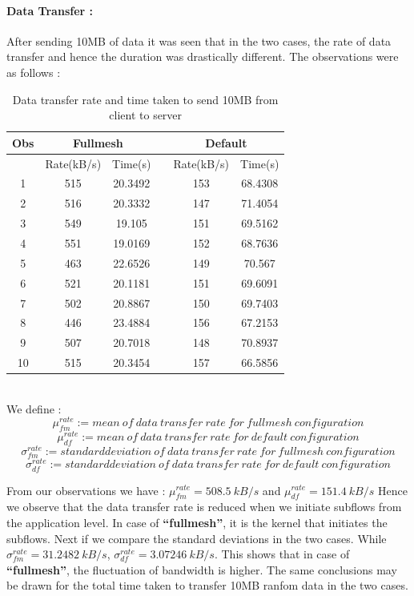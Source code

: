 \documentclass[a4paper,11pt]{article}
\begin{document}
			\paragraph{Data Transfer : }
			\label{subsubsubsec:datatransfer}
			After sending 10MB of data it was seen that in the two cases, the rate of data transfer and hence the duration was drastically different. The observations were as follows :
			\begin{table}[h!]
				
				
				\centering
				\begin{tabular}{|c|c|c|c|c|c|}
					\hline
					Obs & \multicolumn{2}{|c|}{Fullmesh} &  & \multicolumn{2}{|c|}{Default} \\
					\hline
					\hline
					& Rate(kB/s) & Time(s) &  & Rate(kB/s) & Time(s) \\
					\hline
					\hline
					1 & 515 & 20.3492 &  & 153 & 68.4308 \\
					\hline
					2 & 516 & 20.3332 &  & 147 & 71.4054 \\
					\hline
					3 & 549 & 19.105 &  & 151 & 69.5162 \\
					\hline
					4 & 551 & 19.0169 &  & 152 & 68.7636 \\
					\hline
					5 & 463 & 22.6526 &  & 149 & 70.567 \\
					\hline
					6 & 521 & 20.1181 &  & 151 & 69.6091 \\
					\hline
					7 & 502 & 20.8867 &  & 150 & 69.7403 \\
					\hline
					8 & 446 & 23.4884 &  & 156 & 67.2153 \\
					\hline
					9 & 507 & 20.7018 &  & 148 & 70.8937 \\
					\hline
					10 & 515 & 20.3454 &  & 157 & 66.5856 \\
					\hline
				\end{tabular}
				\caption{Data transfer rate and time taken to send 10MB from client to server}
			\end{table} \\
			We define :
			$$\mu_{fm}^{rate} := mean\ of\ data\ transfer\ rate\ for\ fullmesh\ configuration$$ 
			$$\mu_{df}^{rate} := mean\ of\ data\ transfer\ rate\ for\ default\ configuration$$
			$$\sigma_{fm}^{rate} := standard deviation\ of\ data\ transfer\ rate\ for\ fullmesh\ configuration$$
			$$\sigma_{df}^{rate} := standard deviation\ of\ data\ transfer\ rate\ for\ default\ configuration$$

			From our observations we have :
			$\mu_{fm}^{rate} = 508.5\ kB/s$ and $\mu_{df}^{rate} = 151.4\ kB/s$
			Hence we observe that the data transfer rate is reduced when we initiate subflows from the application level. In case of \textbf{``fullmesh''}, it is the kernel that initiates the subflows.
			Next if we compare the standard deviations in the two cases. While $\sigma_{fm}^{rate} = 31.2482\ kB/s$, $\sigma_{df}^{rate} = 3.07246\ kB/s$. This shows that in case of \textbf{``fullmesh''}, the fluctuation of bandwidth is higher. The same conclusions may be drawn for the total time taken to transfer 10MB ranfom data in the two cases.
\end{document}
